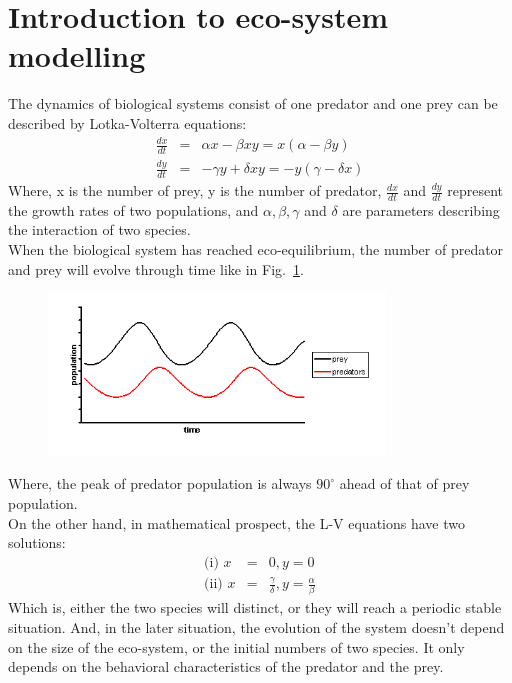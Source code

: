 \documentclass[a4paper,12pt]{article}
\begin{document}
\section{Introduction to eco-system modelling}
The dynamics of biological systems consist of one predator and one prey can be described by Lotka-Volterra equations:
\begin{eqnarray*}
\frac{dx}{dt} &=& \alpha x - \beta x y = x(\alpha - \beta y) \\
\frac{dy}{dt} &=& - \gamma y + \delta x y = - y (\gamma - \delta x)
\end{eqnarray*}
Where, x is the number of prey, y is the number of predator, $\frac{dx}{dt}$ and $\frac{dy}{dt}$ represent the growth rates of two populations, and $\alpha, \beta, \gamma$ and $\delta$ are parameters describing the interaction of two species. \\
When the biological system has reached eco-equilibrium, the number of predator and prey will evolve through time like in Fig.~\ref{Fig:evolution}.
\begin{figure}[!htb]
  \centering
  \includegraphics[width=0.8\textwidth]{./pics/evolution.png}
  \caption{}\label{Fig:evolution}
\end{figure}
Where, the peak of predator population is always $90^{\circ}$ ahead of that of prey population. \\
On the other hand, in mathematical prospect, the L-V equations have two solutions:
\begin{eqnarray*}
\textrm{(i)  } x &=& 0, y = 0 \\
\textrm{(ii)  } x &=& \frac{\gamma}{\delta}, y = \frac{\alpha}{\beta}
\end{eqnarray*}
Which is, either the two species will distinct, or they will reach a periodic stable situation. And, in the later situation, the evolution of the system doesn't depend on the size of the eco-system, or the initial numbers of two species. It only depends on the behavioral characteristics of the predator and the prey. \\
\end{document}
